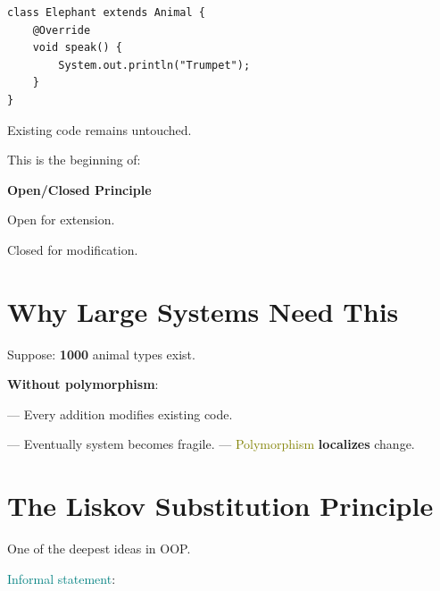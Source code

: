 \documentclass[11pt,a4paper]{book}
\begin{document}
\begin{verbatim}
class Elephant extends Animal {
    @Override
    void speak() {
        System.out.println("Trumpet");
    }
}
\end{verbatim}


Existing code remains untouched.

\newpage
This is the beginning of: 
\begin{center}
\textbf{Open/Closed Principle}
\end{center}


Open for extension.


Closed for modification.


\section{Why Large Systems Need This}

Suppose: \textbf{1000}
animal types exist.


\textbf{Without polymorphism}:

    --- Every addition modifies existing code.


    --- Eventually system becomes fragile.
    \newline
    --- \textcolor{olive}{Polymorphism} \textbf{localizes} change.


\section{The Liskov Substitution Principle}

One of the deepest ideas in OOP.\@


\textcolor{teal}{Informal statement}:
\end{document}
